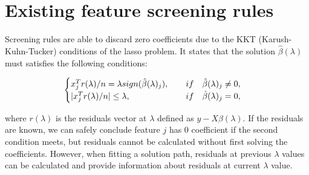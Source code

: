 \documentclass{article}
\begin{document}
\section{Existing feature screening rules}
\label{sec:existing}


Screening rules are able to discard zero coefficients due to the KKT (Karush-Kuhn-Tucker) conditions of the lasso problem. It states that the solution $\hat{\beta}(\lambda)$ must satisfies the following conditions:

\begin{equation}
    \begin{cases}
    x_j^Tr(\lambda)/n = \lambda sign(\hat{\beta}(\lambda)_j),\qquad if\quad \hat{\beta}(\lambda)_j\neq 0,\\
    |x_j^Tr(\lambda)/n| \leq \lambda,\hfill if\quad \hat{\beta}(\lambda)_j= 0,
    \end{cases}
\end{equation}

where $r(\lambda)$ is the residuals vector at $\lambda$ defined as $y-X\hat{\beta}(\lambda)$. If the residuals are known, we can safely conclude feature $j$ has 0 coefficient if the second condition meets, but residuals cannot be calculated without first solving the coefficients. However, when fitting a solution path, residuals at previous $\lambda$ values can be calculated and provide information about residuals at current $\lambda$ value.
\end{document}
